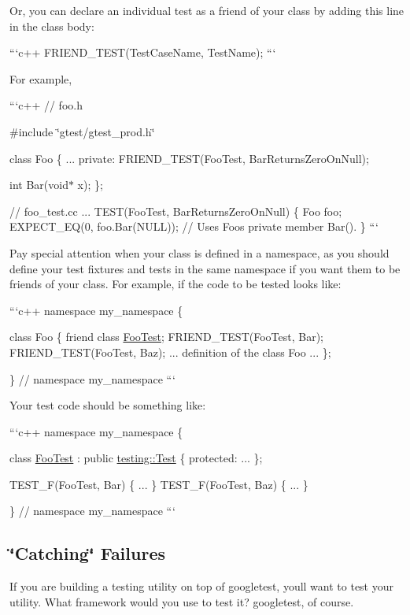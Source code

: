 \begin{DoxyItemize}
Or, you can declare an individual test as a friend of your class by adding this line in the class body\+:

```c++ F\+R\+I\+E\+N\+D\+\_\+\+T\+E\+S\+T(\+Test\+Case\+Name, Test\+Name); ```

For example,

```c++ // foo.\+h

\#include \char`\"{}gtest/gtest\+\_\+prod.\+h\char`\"{}

class Foo \{ ... private\+: F\+R\+I\+E\+N\+D\+\_\+\+T\+E\+S\+T(\+Foo\+Test, Bar\+Returns\+Zero\+On\+Null);

int Bar(void$\ast$ x); \};

// foo\+\_\+test.\+cc ... T\+E\+S\+T(\+Foo\+Test, Bar\+Returns\+Zero\+On\+Null) \{ Foo foo; E\+X\+P\+E\+C\+T\+\_\+\+EQ(0, foo.\+Bar(\+N\+U\+L\+L)); // Uses Foo\textquotesingle{}s private member Bar(). \} ```

Pay special attention when your class is defined in a namespace, as you should define your test fixtures and tests in the same namespace if you want them to be friends of your class. For example, if the code to be tested looks like\+:

```c++ namespace my\+\_\+namespace \{

class Foo \{ friend class \hyperlink{classFooTest}{Foo\+Test}; F\+R\+I\+E\+N\+D\+\_\+\+T\+E\+S\+T(\+Foo\+Test, Bar); F\+R\+I\+E\+N\+D\+\_\+\+T\+E\+S\+T(\+Foo\+Test, Baz); ... definition of the class Foo ... \};

\} // namespace my\+\_\+namespace ```

Your test code should be something like\+:

```c++ namespace my\+\_\+namespace \{

class \hyperlink{classFooTest}{Foo\+Test} \+: public \hyperlink{classtesting_1_1Test}{testing\+::\+Test} \{ protected\+: ... \};

T\+E\+S\+T\+\_\+\+F(\+Foo\+Test, Bar) \{ ... \} T\+E\+S\+T\+\_\+\+F(\+Foo\+Test, Baz) \{ ... \}

\} // namespace my\+\_\+namespace ```
\end{DoxyItemize}

\subsection*{\char`\"{}\+Catching\char`\"{} Failures}

If you are building a testing utility on top of googletest, you\textquotesingle{}ll want to test your utility. What framework would you use to test it? googletest, of course.


